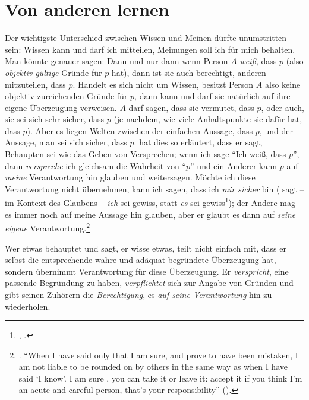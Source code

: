 \section{Von anderen
lernen}\label{subsubsection:EndlichesundUnendlichesErkennen}
Der wichtigste Unterschied zwischen Wissen und Meinen dürfte
unumstritten sein: Wissen kann und darf ich mitteilen, Meinungen soll ich für
mich behalten. Man könnte genauer sagen: Dann und nur dann wenn Person $A$
\emph{weiß}, dass $p$ (also \emph{objektiv gültige} Gründe für $p$ hat), dann
ist sie auch berechtigt, anderen mitzuteilen, dass $p$. Handelt es sich nicht um
Wissen, besitzt Person $A$ also keine objektiv zureichenden Gründe für $p$, dann
kann und darf sie natürlich auf ihre eigene Überzeugung verweisen. $A$ darf
sagen, dass sie vermutet, dass $p$, oder auch, sie sei sich sehr sicher, dass
$p$ (je nachdem, wie viele Anhaltspunkte sie dafür hat, dass $p$). Aber es
liegen Welten zwischen der einfachen Aussage, dass $p$, und der Aussage, man sei
sich sicher, dass $p$.  hat dies so
erläutert, dass er sagt, Behaupten sei wie das Geben von Versprechen; wenn ich
sage \enquote{Ich weiß, dass $p$}, dann \emph{verspreche} ich gleichsam die
Wahrheit von \enquote{$p$} und ein Anderer kann {$p$} auf \emph{meine}
Verantwortung hin glauben und weitersagen. Möchte ich diese Verantwortung nicht übernehmen, kann ich sagen,
dass ich \emph{mir sicher} bin ( sagt -- im Kontext des
Glaubens -- \emph{ich} sei gewiss, statt \emph{es} sei
gewiss\footnote{\cite[Vgl.][B 857]{Kant:KritikderreinenVernunft2003},
\cite[][III: 537.1--2]{Kant:GesammelteWerke1900ff.}.}); der Andere mag es
immer noch auf meine Aussage hin glauben, aber er glaubt es dann auf
\emph{seine eigene}
Verantwortung.\footnote{\cite[Vgl.][98--103]{Austin:OtherMinds1979}.
\enquote{When I have said only that I am sure, and prove to have been mistaken,
I am not liable to be rounded on by others in the same way as when I have said
\enquote{I know}. I am sure , you can take it or leave it:
accept it if you think I'm an acute and careful person, that's your
responsibility} (\cite[][100]{Austin:OtherMinds1979}).}

Wer etwas behauptet und sagt, er wisse etwas, teilt nicht einfach mit, dass er
selbst die entsprechende wahre und adäquat begründete Überzeugung hat, sondern
übernimmt  Verantwortung für diese Überzeugung. Er \textit{verspricht}, eine
passende Begründung zu haben, \emph{verpflichtet} sich zur Angabe von Gründen
und gibt seinen Zuhörern die \textit{Berechtigung}, es \emph{auf seine
Verantwortung} hin zu wiederholen. 

